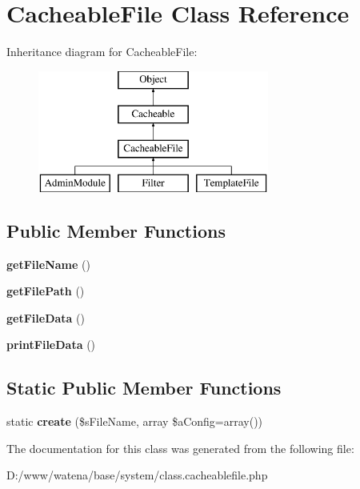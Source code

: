 \hypertarget{class_cacheable_file}{\section{Cacheable\-File Class Reference}
\label{class_cacheable_file}
}
Inheritance diagram for Cacheable\-File\-:\begin{figure}[H]
\begin{center}
\leavevmode
\includegraphics[height=4.000000cm]{class_cacheable_file}
\end{center}
\end{figure}
\subsection*{Public Member Functions}
\begin{DoxyCompactItemize}
\item 
\hypertarget{class_cacheable_file_a87904f2e1e5d23c0f815417e35305f20}{{\bfseries get\-File\-Name} ()}\label{class_cacheable_file_a87904f2e1e5d23c0f815417e35305f20}

\item 
\hypertarget{class_cacheable_file_a8aba2b54ee398ffbcdd40c68c88a8552}{{\bfseries get\-File\-Path} ()}\label{class_cacheable_file_a8aba2b54ee398ffbcdd40c68c88a8552}

\item 
\hypertarget{class_cacheable_file_a192428e46152e5958419a86b5bcabb16}{{\bfseries get\-File\-Data} ()}\label{class_cacheable_file_a192428e46152e5958419a86b5bcabb16}

\item 
\hypertarget{class_cacheable_file_a3a4f251e8fe926c5faee6c75ba20dc4a}{{\bfseries print\-File\-Data} ()}\label{class_cacheable_file_a3a4f251e8fe926c5faee6c75ba20dc4a}

\end{DoxyCompactItemize}
\subsection*{Static Public Member Functions}
\begin{DoxyCompactItemize}
\item 
\hypertarget{class_cacheable_file_abee38e112bd5e6b6a0a331f310879ad0}{static {\bfseries create} (\$s\-File\-Name, array \$a\-Config=array())}\label{class_cacheable_file_abee38e112bd5e6b6a0a331f310879ad0}

\end{DoxyCompactItemize}


The documentation for this class was generated from the following file\-:\begin{DoxyCompactItemize}
\item 
D\-:/www/watena/base/system/class.\-cacheablefile.\-php\end{DoxyCompactItemize}

